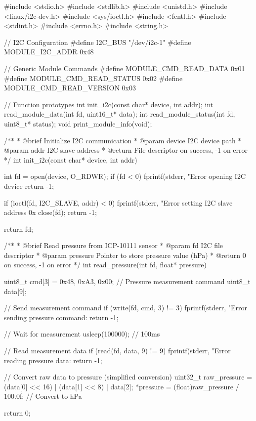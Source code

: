 \documentclass[11pt,a4paper]{article}
\begin{document}
#include <stdio.h>
#include <stdlib.h>
#include <unistd.h>
#include <linux/i2c-dev.h>
#include <sys/ioctl.h>
#include <fcntl.h>
#include <stdint.h>
#include <errno.h>
#include <string.h>

// I2C Configuration
#define I2C_BUS "/dev/i2c-1"
#define MODULE_I2C_ADDR 0x48

// Generic Module Commands
#define MODULE_CMD_READ_DATA 0x01
#define MODULE_CMD_READ_STATUS 0x02
#define MODULE_CMD_READ_VERSION 0x03

// Function prototypes
int init_i2c(const char* device, int addr);
int read_module_data(int fd, uint16_t* data);
int read_module_status(int fd, uint8_t* status);
void print_module_info(void);

/**
 * @brief Initialize I2C communication
 * @param device I2C device path
 * @param addr I2C slave address
 * @return File descriptor on success, -1 on error
 */
int init_i2c(const char* device, int addr) {
    int fd = open(device, O_RDWR);
    if (fd < 0) {
        fprintf(stderr, "Error opening I2C device %
        return -1;
    }
    
    if (ioctl(fd, I2C_SLAVE, addr) < 0) {
        fprintf(stderr, "Error setting I2C slave address 0x%
        close(fd);
        return -1;
    }
    
    return fd;
}

/**
 * @brief Read pressure from ICP-10111 sensor
 * @param fd I2C file descriptor
 * @param pressure Pointer to store pressure value (hPa)
 * @return 0 on success, -1 on error
 */
int read_pressure(int fd, float* pressure) {
    uint8_t cmd[3] = {0x48, 0xA3, 0x00}; // Pressure measurement command
    uint8_t data[9];
    
    // Send measurement command
    if (write(fd, cmd, 3) != 3) {
        fprintf(stderr, "Error sending pressure command: %
        return -1;
    }
    
    // Wait for measurement
    usleep(100000); // 100ms
    
    // Read measurement data
    if (read(fd, data, 9) != 9) {
        fprintf(stderr, "Error reading pressure data: %
        return -1;
    }
    
    // Convert raw data to pressure (simplified conversion)
    uint32_t raw_pressure = (data[0] << 16) | (data[1] << 8) | data[2];
    *pressure = (float)raw_pressure / 100.0f; // Convert to hPa
    
    return 0;
}
\end{document}
